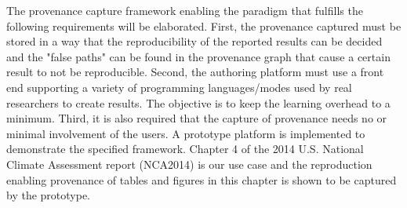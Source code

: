 The provenance capture framework enabling the paradigm that fulfills the following requirements will be elaborated. First, the provenance captured must be stored in a way that the reproducibility of the reported results can be decided and the "false paths" can be found in the provenance graph that cause a certain result to not be reproducible. Second, the authoring platform must use a front end supporting a variety of programming languages/modes used by real researchers to create results. The objective is to keep the learning overhead to a minimum. Third, it is also required that the capture of provenance needs no or minimal involvement of the users. A prototype platform is implemented to demonstrate the specified framework. Chapter 4 of the 2014 U.S. National Climate Assessment report (NCA2014) is our use case and the reproduction enabling provenance of tables and figures in this chapter is shown to be captured by the prototype.




